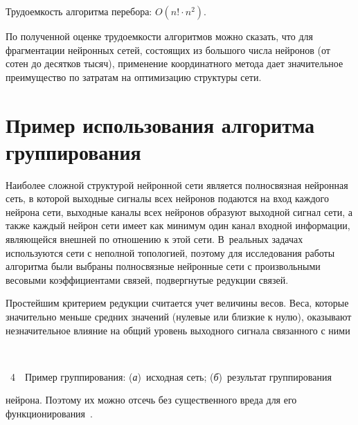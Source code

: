 \begin{multicols}{2}
     Трудоемкость алгоритма перебора: $O(n!\cdot n^2)$.
     
     По полученной оценке трудоемкости алгоритмов можно сказать, что 
для фрагментации нейронных сетей, состоящих из большого числа нейронов 
(от сотен до десятков тысяч), применение координатного метода дает 
значительное преимущество по затратам на оптимизацию структуры сети.

\section{Пример использования алгоритма группирования}
     
     Наиболее сложной структурой нейронной сети является полносвязная 
нейронная сеть, в которой выходные сигналы всех 
нейронов подаются на вход каждого нейрона сети, выходные каналы всех 
нейронов образуют выходной сигнал сети, а также каждый нейрон сети 
имеет как минимум один канал входной информации, являющейся внешней 
по отношению к этой сети. В~реальных задачах используются сети с 
неполной топологией,  поэтому для исследования работы алгоритма были 
выбраны полносвязные нейронные сети с произвольными весовыми 
коэффициентами связей, подвергнутые редукции связей.
     
     Простейшим критерием редукции считается учет величины весов. 
Веса, которые значительно меньше средних значений (нулевые или близкие к 
нулю), оказывают незначительное влияние на общий уровень выходного 
сигнала связанного с ними\linebreak\vspace*{-12pt}
\columnbreak

\vspace*{-18pt}

\noindent
\begin{center} %
\vspace*{12pt}
\mbox{%
\epsfxsize=78.405mm
}
\end{center}
\vspace*{4pt}
{{\figurename~4}\ \ \small{Пример группирования: (\textit{а})~исходная сеть; (\textit{б})~результат 
группирования}}

\bigskip
\addtocounter{figure}{1}

\noindent 
 нейрона. Поэтому их можно отсечь без 
существенного вреда для его функционирования~\cite{8step}.
     

\end{multicols}
